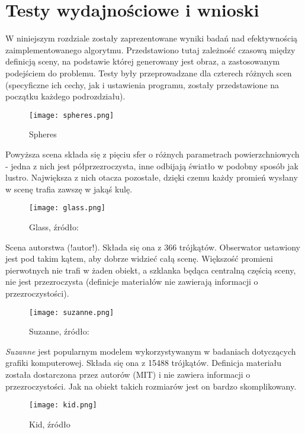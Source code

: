 \section{Testy wydajnościowe i wnioski}

W niniejszym rozdziale zostały zaprezentowane wyniki badań nad efektywnością zaimplementowanego algorytmu. Przedstawiono tutaj zależność czasową między definicją sceny, na podstawie której generowany jest obraz, a zastosowanym podejściem do problemu. Testy były przeprowadzane dla czterech różnych scen (specyficzne ich cechy, jak i ustawienia programu, zostały przedstawione na początku każdego podrozdziału).

\begin{figure}[htb!]
\centering
  \caption{Spheres}
  \texttt{[image: spheres.png]}
\end{figure}

Powyższa scena składa się z pięciu sfer o różnych parametrach powierzchniowych - jedna z nich jest półprzezroczysta, inne odbijają światło w podobny sposób jak lustro. Największa z nich otacza pozostałe, dzięki czemu każdy promień wysłany w scenę trafia zawszę w jakąś kulę.

\begin{figure}[htb!]
\centering
  \caption{Glass, źródło: }
  \texttt{[image: glass.png]}
\end{figure}

Scena autorstwa (!autor!). Składa się ona z 366 trójkątów. Obserwator ustawiony jest pod takim kątem, aby dobrze widzieć całą scenę. Większość promieni pierwotnych nie trafi w żaden obiekt, a szklanka będąca centralną częścią sceny, nie jest przezroczysta (definicje materiałów nie zawierają informacji o przezroczystości).
\pagebreak

\begin{figure}[htb!]
\centering
  \caption{Suzanne, źródło: }
  \texttt{[image: suzanne.png]}
\end{figure}


\emph{Suzanne} jest popularnym modelem wykorzystywanym w badaniach dotyczących grafiki komputerowej. Składa się ona z 15488 trójkątów. Definicja materiału została dostarczona przez autorów (MIT) i nie zawiera informacji o przezroczystości. Jak na obiekt takich rozmiarów jest on bardzo skomplikowany.

\begin{figure}[htb!]
\centering
  \caption{Kid, źródło}
  \texttt{[image: kid.png]}
\end{figure}

